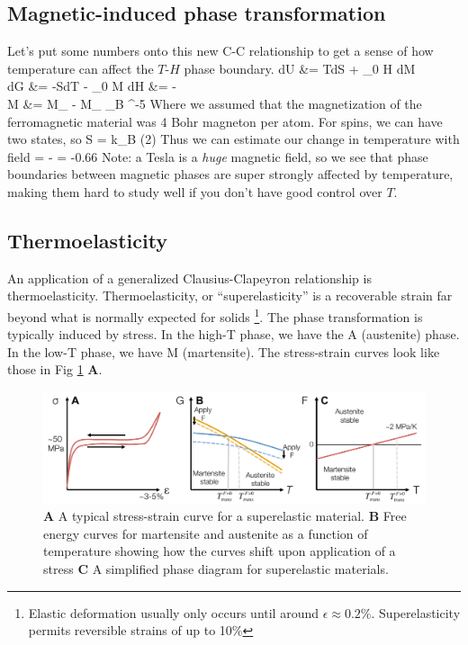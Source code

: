 \documentclass[12pt]{article}
\begin{document}
\subsection{Magnetic-induced phase transformation}
Let's put some numbers onto this new C-C relationship to get a sense of how temperature can affect the $T$-$H$ phase boundary.
\eqs
dU &= TdS + \mu_0 H dM\\
dG &= -SdT - \mu_0 M dH
\eqe
\eqs
{} &= -\\
\eqe
\eqs
\Delta M &= M_ - M_  \mu_B  ^{-5} 
\eqe
Where we assumed that the magnetization of the ferromagnetic material was 4 Bohr magneton per atom.  For spins, we can have two states, so 
\eqs
\Delta S = k_B \ln(2)
\eqe
Thus we can estimate our change in temperature with field
\eqs
{} = - = -0.66 
\eqe
Note: a Tesla is a \emph{huge} magnetic field, so we see that phase boundaries between magnetic phases are super strongly affected by temperature, making them hard to study well if you don't have good control over $T$.

\subsection{Thermoelasticity}
An application of a generalized Clausius-Clapeyron relationship is thermoelasticity. Thermoelasticity, or ``superelasticity'' is a recoverable strain far beyond what is normally expected for solids \footnote{Elastic deformation usually only occurs until around $\epsilon \approx 0.2\%$. Superelasticity permits reversible strains of up to 10\%}.  The phase transformation is typically induced by stress.  In the high-T phase, we have the A (austenite) phase.  In the low-T phase, we have M (martensite).
The stress-strain curves look like those in Fig \ref{superElasticity} \textbf{A}.

\begin{figure}[h]
\centering
\includegraphics[width=\textwidth]{superelasticity}
\caption{\textbf{A} A typical stress-strain curve for a superelastic material. \textbf{B} Free energy curves for martensite and austenite as a function of temperature showing how the curves shift upon application of a stress \textbf{C} A simplified phase diagram for superelastic materials.}
\label{superElasticity}
\end{figure}
\end{document}
